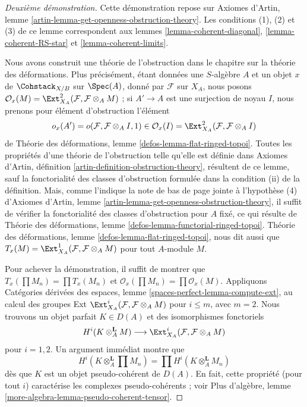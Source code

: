 \begin{proof}[Deuxième démonstration]
Cette démonstration repose sur Axiomes d'Artin, lemme
\ref{artin-lemma-get-openness-obstruction-theory}. Les conditions (1), (2) et
(3) de ce lemme correspondent aux lemmes \ref{lemma-coherent-diagonal},
\ref{lemma-coherent-RS-star} et \ref{lemma-coherent-limits}.

\medskip\noindent
Nous avons construit une théorie de l'obstruction dans le chapitre sur la
théorie des déformations. Plus précisément, étant données une $S$-algèbre $A$
et un objet $x$ de $\Cohstack_{X/B}$ sur $\Spec(A)$, donné par
$\mathcal{F}$ sur $X_A$, nous posons
$\mathcal{O}_x(M) = \Ext^2_{X_A}(\mathcal{F}, \mathcal{F} \otimes_A M)$ ; si
$A' \to A$ est une surjection de noyau $I$, nous prenons pour élément
d'obstruction l'élément
$$
o_x(A') = o(\mathcal{F}, \mathcal{F} \otimes_A I, 1) \in
\mathcal{O}_x(I) = \Ext^2_{X_A}(\mathcal{F}, \mathcal{F} \otimes_A I)
$$
de Théorie des déformations, lemme \ref{defos-lemma-flat-ringed-topoi}.
Toutes les propriétés d'une théorie de l'obstruction telle qu'elle est définie
dans Axiomes d'Artin, définition
\ref{artin-definition-obstruction-theory}, résultent de ce lemme, sauf la
fonctorialité des classes d'obstruction formulée dans la condition (ii) de la
définition. Mais, comme l'indique la note de bas de page jointe à l'hypothèse
(4) d'Axiomes d'Artin, lemme
\ref{artin-lemma-get-openness-obstruction-theory}, il suffit de vérifier la
fonctorialité des classes d'obstruction pour $A$ fixé, ce qui résulte de
Théorie des déformations, lemme
\ref{defos-lemma-functorial-ringed-topoi}. Théorie des déformations, lemme
\ref{defos-lemma-flat-ringed-topoi}, nous dit aussi que
$T_x(M) = \Ext^1_{X_A}(\mathcal{F}, \mathcal{F} \otimes_A M)$ pour tout
$A$-module $M$.

\medskip\noindent
Pour achever la démonstration, il suffit de montrer que
$T_x(\prod M_n) = \prod T_x(M_n)$ et
$\mathcal{O}_x(\prod M_n) = \prod \mathcal{O}_x(M)$. Appliquons Catégories
dérivées des espaces, lemme \ref{spaces-perfect-lemma-compute-ext}, au calcul
des groupes Ext $\Ext^i_{X_A}(\mathcal{F}, \mathcal{F} \otimes_A M)$ pour
$i \leq m$, avec $m = 2$. Nous trouvons un objet parfait $K \in D(A)$ et des
isomorphismes fonctoriels
$$
H^i(K \otimes_A^\mathbf{L} M)
\longrightarrow
\Ext^i_{X_A}(\mathcal{F}, \mathcal{F} \otimes_A M)
$$
pour $i = 1, 2$. Un argument immédiat montre que
$$
H^i(K \otimes_A^\mathbf{L} \prod M_n) =
\prod H^i(K \otimes_A^\mathbf{L} M_n)
$$
dès que $K$ est un objet pseudo-cohérent de $D(A)$. En fait, cette propriété
(pour tout $i$) caractérise les complexes pseudo-cohérents ; voir Plus
d'algèbre, lemme \ref{more-algebra-lemma-pseudo-coherent-tensor}.
\end{proof}

